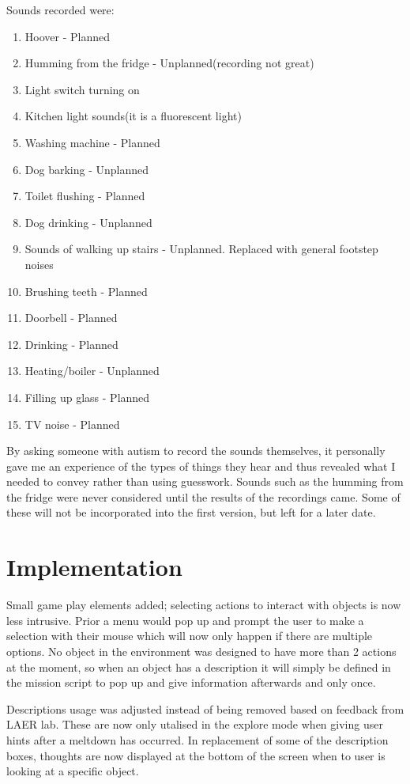 \documentclass[11pt]{report}
\begin{document}
Sounds recorded were:

\begin{enumerate}
\item Hoover - Planned
\item Humming from the fridge - Unplanned(recording not great)
\item Light switch turning on
\item Kitchen light sounds(it is a fluorescent light)
\item Washing machine - Planned
\item Dog barking - Unplanned
\item Toilet flushing - Planned
\item Dog drinking - Unplanned
\item Sounds of walking up stairs - Unplanned. Replaced with general footstep noises
\item Brushing teeth - Planned
\item Doorbell - Planned
\item Drinking - Planned
\item Heating/boiler - Unplanned
\item Filling up glass - Planned
\item TV noise - Planned
\end{enumerate}

By asking someone with autism to record the sounds themselves, it personally gave me an experience of the types of things they hear and thus revealed what I needed to convey rather than using guesswork. Sounds such as the humming from the fridge were never considered until the results of the recordings came. Some of these will not be incorporated into the first version, but left for a later date. 

\section{Implementation}

Small game play elements added; selecting actions to interact with objects is now less intrusive. Prior a menu would pop up and prompt the user to make a selection with their mouse which will now only happen if there are multiple options. No object in the environment was designed to have more than 2 actions at the moment, so when an object has a description it will simply be defined in the mission script to pop up and give information afterwards and only once. 

Descriptions usage was adjusted instead of being removed based on feedback from LAER lab. These are now only utalised in the explore mode when giving user hints after a meltdown has occurred. In replacement of some of the description boxes, thoughts are now displayed at the bottom of the screen when to user is looking at a specific object. 
\end{document}
